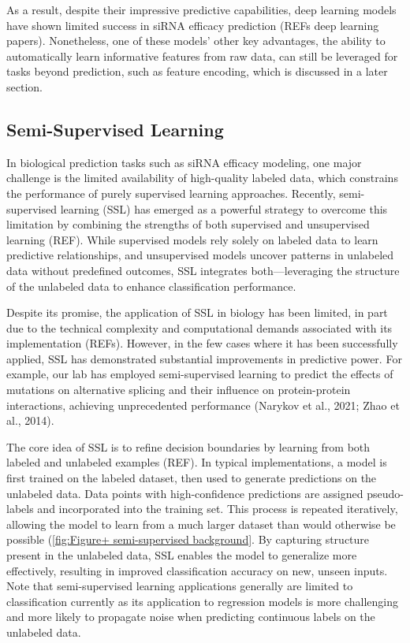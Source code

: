 \documentclass{report}
\begin{document}
As a result, despite their impressive predictive capabilities, deep learning models have shown limited success in siRNA efficacy prediction (REFs deep learning papers). Nonetheless, one of these models' other key advantages, the ability to automatically learn informative features from raw data, can still be leveraged for tasks beyond prediction, such as feature encoding, which is discussed in a later section.


\subsection{Semi-Supervised Learning}\label{sec:semi-supervised learning}

In biological prediction tasks such as siRNA efficacy modeling, one major challenge is the limited availability of high-quality labeled data, which constrains the performance of purely supervised learning approaches. Recently, semi-supervised learning (SSL) has emerged as a powerful strategy to overcome this limitation by combining the strengths of both supervised and unsupervised learning (REF). While supervised models rely solely on labeled data to learn predictive relationships, and unsupervised models uncover patterns in unlabeled data without predefined outcomes, SSL integrates both—leveraging the structure of the unlabeled data to enhance classification performance.

Despite its promise, the application of SSL in biology has been limited, in part due to the technical complexity and computational demands associated with its implementation (REFs). However, in the few cases where it has been successfully applied, SSL has demonstrated substantial improvements in predictive power. For example, our lab has employed semi-supervised learning to predict the effects of mutations on alternative splicing and their influence on protein-protein interactions, achieving unprecedented performance (Narykov et al., 2021; Zhao et al., 2014). 

The core idea of SSL is to refine decision boundaries by learning from both labeled and unlabeled examples (REF). In typical implementations, a model is first trained on the labeled dataset, then used to generate predictions on the unlabeled data. Data points with high-confidence predictions are assigned pseudo-labels and incorporated into the training set. This process is repeated iteratively, allowing the model to learn from a much larger dataset than would otherwise be possible (\ref{fig:Figure+ semi-supervised background}. By capturing structure present in the unlabeled data, SSL enables the model to generalize more effectively, resulting in improved classification accuracy on new, unseen inputs. Note that semi-supervised learning applications generally are limited to classification currently as its application to regression models is more challenging and more likely to propagate noise when predicting continuous labels on the unlabeled data. 
\end{document}
